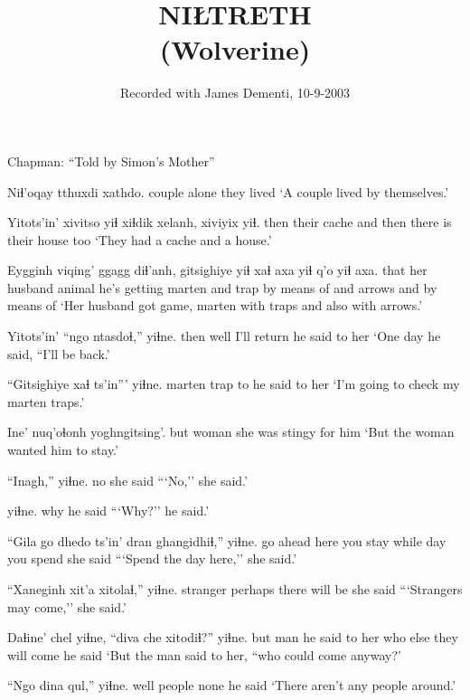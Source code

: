 \documentclass[12pt]{article}
\begin{document}
\title{NIŁTRETH \\(Wolverine)}

\author{Recorded with James Dementi, 10-9-2003}
\date{}

\maketitle

Chapman:  ``Told by Simon's Mother''

\gll Niɬ'oqay tthuxdi xathdo.
couple alone {they lived}
\glt `A couple lived by themselves.'
\glend

\gll Yitots'in' xivitso yiɬ xiɬdik xelanh, xiviyix  yiɬ.
then  {their cache} and then {there is} {their house} too
\glt `They had a cache and a house.'
\glend

\gll Eygginh viqing' ggagg  diɬ'anh, gitsighiye yiɬ xaɬ axa yiɬ q'o yiɬ axa.
that {her husband} animal {he's getting} marten and trap {by means of} and arrows and {by means of}
\glt `Her husband got game, marten with traps and also with arrows.'
\glend

\gll Yitots'in' ``ngo ntasdoɬ,'' yiɬne.
then  well {I'll return} {he said to her}
\glt `One day he said, ``I'll be back.'
\glend

\gll ``Gitsighiye xaɬ ts'in''' yiɬne.
marten trap to  {he said to her}
\glt `I'm going to check my marten traps.'
\glend

\gll Ine' nuq'oɬonh yoghngitsing'.
but woman {she was stingy for him}
\glt `But the woman wanted him to stay.'
\glend

\gll ``Inagh,'' yiɬne.
no  {she said}
\glt ```No,'' she said.'
\glend

 yiɬne.
why   {he said}
\glt ```Why?'' he said.'
\glend

\gll ``Gila go dhedo ts'in' dran ghangidhiɬ,'' yiɬne.
{go ahead} here {you stay} while day {you spend} {she said}
\glt ```Spend the day here,'' she said.'
\glend

\gll ``Xaneginh xit'a  xitolaɬ,'' yiɬne.
stranger perhaps {there will be} {she said}
\glt ```Strangers may come,'' she said.'
\glend

\gll Daɬine' chel yiɬne,  ``diva che xitodiɬ?'' yiɬne.
but  man {he said to her} who else {they will come} {he said}
\glt `But the man said to her, ``who could come anyway?'
\glend

\gll ``Ngo dina qul,''  yiɬne.
well people none {he said}
\glt `There aren't any people around.'
\glend
\end{document}
